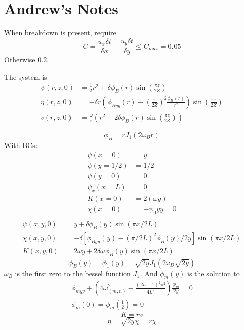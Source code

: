 \documentclass{X:/Documents/Coding/Latex/myreport}
\begin{document}
\section{Andrew's Notes}


When breakdown is present, require
\[C = \frac{u_x \delta t}{\delta x} + \frac{u_y \delta t}{\delta y} \leq C_{max} = 0.05\]
Otherwise $0.2$.


The system is
\begin{align*}
    \psi(r,z,0) &= \frac12 r^2 + \delta \phi_B(r) \sin\left(\frac{\pi z}{2Z}\right)\\
    \eta(r,z,0) &= - \delta r \left(\phi_{Byy}(r) - \left(\frac{\pi}{2Z}\right)^2 \frac{\phi_B(r)}{r^2}\right)  \sin\left(\frac{\pi z}{2Z}\right)\\
    v(r,z,0) &= \frac{\omega}{r} \left(r^2  +2\delta \phi_B(r) \sin\left(\frac{\pi z}{2Z}\right)\right)
\end{align*}



\[\phi_B = r J_1(2\omega_B r)\]
With BCs:
\begin{align*}
    \psi(x=0) &= y\\
    \psi(y=1/2) &= 1/2\\
    \psi(y=0) &= 0\\
    \psi_x(x=L) &= 0 \\
    K(x=0) &= 2(\omega y)\\
    \chi(x=0) &= - \psi_0{yy} = 0\\
\end{align*}
\begin{align*}
  \psi(x,y,0) &= y + \delta \phi_B(y) \sin(\pi x/2L)\\
  \chi(x,y,0) &= -\delta[\phi_{Byy}(y) -(\pi/2L)^2 \phi_B(y)/2y]\sin(\pi x/2L)\\
  K(x,y,0) &= 2 \omega y + 2  \delta \omega \phi_B(y) \sin (\pi x/2L)
\end{align*}
\[\phi_B(y) = \phi_1(y) = \sqrt{2y} J_1(2\omega_B \sqrt{2y})\]
$\omega_B$ is the first zero to the bessel function $J_1$.
And $\phi_{m}(y)$ is the solution to
\begin{align*}
    \phi_{myy} + \left(4 \omega^2_{(m,n)} - \frac{(2n -1)^2 \pi^2}{4L^2}\right) \frac{\phi_m}{2y} = 0\\
    \phi_m(0) = \phi_m(\frac12) = 0
\end{align*}
\[K = rv\]
\[\eta = \sqrt{2y} \chi = r \chi \]
\end{document}
